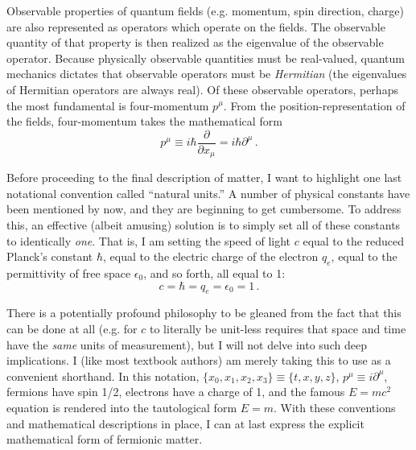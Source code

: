     Observable properties of quantum fields (e.g. momentum, spin direction, charge)
        are also represented as operators which operate on the fields.
    The observable quantity of that property is then realized as the eigenvalue of the observable operator.
    Because physically observable quantities must be real-valued,
        quantum mechanics dictates that observable operators must be \textit{Hermitian}
        (the eigenvalues of Hermitian operators are always real)\cite{Griffiths_book}.
    Of these observable operators, perhaps the most fundamental is four-momentum $p^\mu$.
    From the position-representation of the fields,
        four-momentum takes the mathematical form
    \begin{equation}
        p^\mu \equiv i \hbar \frac{\partial}{\partial x_\mu} = i \hbar \partial^\mu
        \,.
    \end{equation}

    Before proceeding to the final description of matter, I want to highlight one last notational convention called ``natural units.''
    A number of physical constants have been mentioned by now, and they are beginning to get cumbersome.
    To address this, an effective (albeit amusing) solution is to simply set all of these constants to identically \textit{one}.
    That is, I am setting the speed of light $c$ equal to the reduced Planck's constant $\hbar$,
        equal to the electric charge of the electron $q_e$, equal to the permittivity of free space $\epsilon_0$,
        and so forth, all equal to 1:
    \begin{equation} c=\hbar=q_e=\epsilon_0=1 \,. \end{equation}

    There is a potentially profound philosophy to be gleaned from the fact that this can be done at all
        (e.g. for $c$ to literally be unit-less requires that space and time have the \textit{same} units of measurement),
        but I will not delve into such deep implications.
    I (like most textbook authors) am merely taking this to use as a convenient shorthand.
    In this notation, $\{x_0, x_1, x_2, x_3\} \equiv \{t,x,y,z\}$,
        $p^\mu \equiv i \partial^\mu$,
        fermions have spin 1/2,
        electrons have a charge of 1,
        and the famous $E=mc^2$ equation is rendered into the tautological form $E=m$.
    With these conventions and mathematical descriptions in place,
        I can at last express the explicit mathematical form of fermionic matter.

